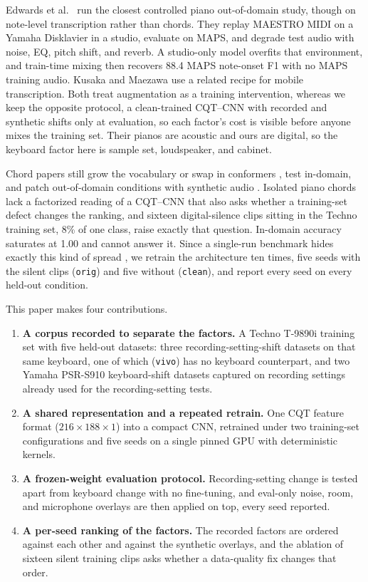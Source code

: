 \documentclass[pdflatex,sn-mathphys-num,iicol]{sn-jnl}
\begin{document}
Edwards et al.\ \cite{Edwards2024} run the closest controlled piano out-of-domain study, though on note-level transcription rather than chords. They replay MAESTRO MIDI on a Yamaha Disklavier in a studio, evaluate on MAPS, and degrade test audio with noise, EQ, pitch shift, and reverb. A studio-only model overfits that environment, and train-time mixing then recovers 88.4 MAPS note-onset F1 with no MAPS training audio. Kusaka and Maezawa \cite{Kusaka2024} use a related recipe for mobile transcription. Both treat augmentation as a training intervention, whereas we keep the opposite protocol, a clean-trained CQT--CNN with recorded and synthetic shifts only at evaluation, so each factor's cost is visible before anyone mixes the training set. Their pianos are acoustic and ours are digital, so the keyboard factor here is sample set, loudspeaker, and cabinet.

Chord papers still grow the vocabulary \cite{Majchrzak2025} or swap in conformers \cite{Akram2025}, test in-domain, and patch out-of-domain conditions with synthetic audio \cite{Byambatsogt2020,Ostermann2023}. Isolated piano chords lack a factorized reading of a CQT--CNN that also asks whether a training-set defect changes the ranking, and sixteen digital-silence clips sitting in the Techno training set, 8\% of one class, raise exactly that question. In-domain accuracy saturates at 1.00 and cannot answer it. Since a single-run benchmark hides exactly this kind of spread \cite{Bouthillier2021}, we retrain the architecture ten times, five seeds with the silent clips (\texttt{orig}) and five without (\texttt{clean}), and report every seed on every held-out condition.

This paper makes four contributions.
\begin{enumerate}
\item \textbf{A corpus recorded to separate the factors.} A Techno T-9890i training set with five held-out datasets: three recording-setting-shift datasets on that same keyboard, one of which (\texttt{vivo}) has no keyboard counterpart, and two Yamaha PSR-S910 keyboard-shift datasets captured on recording settings already used for the recording-setting tests.
\item \textbf{A shared representation and a repeated retrain.} One CQT feature format ($216\times188\times1$) into a compact CNN, retrained under two training-set configurations and five seeds on a single pinned GPU with deterministic kernels.
\item \textbf{A frozen-weight evaluation protocol.} Recording-setting change is tested apart from keyboard change with no fine-tuning, and eval-only noise, room, and microphone overlays are then applied on top, every seed reported.
\item \textbf{A per-seed ranking of the factors.} The recorded factors are ordered against each other and against the synthetic overlays, and the ablation of sixteen silent training clips asks whether a data-quality fix changes that order.
\end{enumerate}
\end{document}
